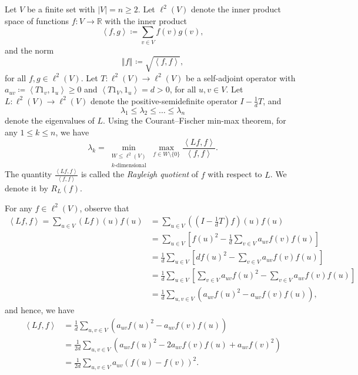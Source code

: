\documentclass[12pt,a4paper,bold]{thesis}
\theoremstyle{definition}
\newcommand*{\map}[3]{#1 \colon #2 \to #3}
\newcommand*{\ip}[2]{\left\langle #1 , #2 \right\rangle}
\newcommand*{\norm}[2][]{\left\Vert #2 \right\Vert_{#1}}
\begin{document}
Let $V$ be a finite set with $|V| = n \geq 2$. Let $\ell^2(V)$ denote 
the inner product space of functions $\map{f}{V}{\mathbb{R}}$ with the inner product
\begin{equation*}
    \ip{f}{g} \coloneq \sum_{v \in V} f(v)g(v),
\end{equation*}
and the norm 
\begin{equation*}
    \norm{f} \coloneq \sqrt{\ip{f}{f}},
\end{equation*}
for all $f, g \in \ell^2(V)$. Let $\map{T}{\ell^2(V)}{\ell^2(V)}$ be a self-adjoint
operator with $a_{uv} \coloneq \ip{T1_v}{1_u} \geq 0$ and $\ip{T1_V}{1_u} = d > 0$,
for all $u, v \in V$. Let $\map{L}{\ell^2(V)}{\ell^2(V)}$ denote the positive-semidefinite 
operator $I - \frac{1}{d}T$, and 
\begin{equation*}
    \lambda_1 \leq \lambda_2 \leq \dots \leq \lambda_n 
\end{equation*}
denote the eigenvalues of $L$. Using the Courant--Fischer min-max theorem, 
for any $1 \leq k \leq n$, we have
\begin{equation} \label{eq:char-of-evalues}
    \lambda_k = \min_{\substack{W \leq \ell^2(V) \\ k \text{-dimensional}}}
    \max_{f \in W \setminus \{0\}} \frac{\ip{Lf}{f}}{\ip{f}{f}}.
\end{equation}
The quantity $\frac{\ip{Lf}{f}}{\ip{f}{f}}$ is called the \emph{Rayleigh quotient}
of $f$ with respect to $L$. We denote it by $R_L(f)$.

For any $f \in \ell^2(V)$, observe that
\begin{align*}
    \ip{Lf}{f} = \sum_{u \in V} (Lf)(u)f(u) 
    & = 
    \sum_{u \in V} \left(\left(I - \frac{1}{d}T\right)f\right)(u)f(u)
    \\
    & =
    \sum_{u \in V} \left[f(u)^2 - \frac{1}{d} \sum_{v \in V} a_{uv}f(v)f(u)\right]
    \\
    & = 
    \frac{1}{d} \sum_{u \in V} \left[d f(u)^2 - \sum_{v \in V} a_{uv}f(v)f(u)\right]
    \\
    & =
    \frac{1}{d} \sum_{u \in V} \left[\sum_{v \in V} a_{uv}f(u)^2 
    - \sum_{v \in V} a_{uv}f(v)f(u)\right]
	\\
	& = 
	\frac{1}{d} \sum_{u,v \in V} (a_{uv}f(u)^2 - a_{uv}f(v)f(u)), 
\end{align*}
and hence, we have
\begin{align}
    \ip{Lf}{f} & = \frac{1}{d} \sum_{u,v \in V} (a_{uv}f(u)^2 - a_{uv}f(v)f(u)) \nonumber
    \\
    & =
    \frac{1}{2d} \sum_{u,v \in V} (a_{uv}f(u)^2 - 2 a_{uv}f(v)f(u) + a_{uv}f(v)^2) \nonumber
    \\
    & = 
    \frac{1}{2d} \sum_{u,v \in V} a_{uv} (f(u) - f(v))^2. \label{eq:Lf.f}
\end{align}
\end{document}
